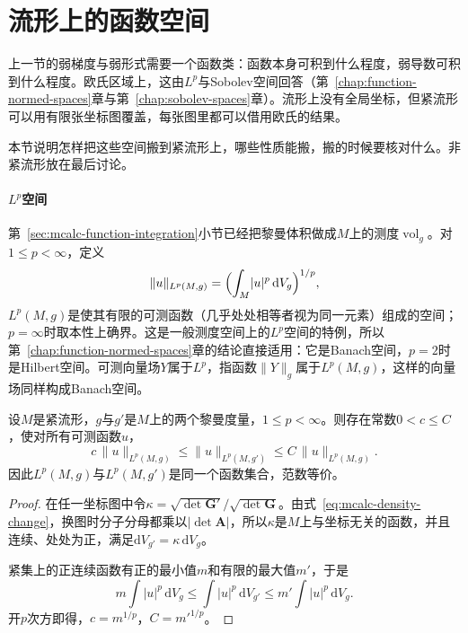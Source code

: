 \section{流形上的函数空间}
\label{sec:mcalc-function-spaces}

上一节的弱梯度与弱形式需要一个函数类：函数本身可积到什么程度，弱导数可积到什么程度。欧氏区域上，这由$L^p$与Sobolev空间回答（第~\ref{chap:function-normed-spaces}章与第~\ref{chap:sobolev-spaces}章）。流形上没有全局坐标，但紧流形可以用有限张坐标图覆盖，每张图里都可以借用欧氏的结果。

本节说明怎样把这些空间搬到紧流形上，哪些性质能搬，搬的时候要核对什么。非紧流形放在最后讨论。

\paragraph{$L^p$空间}
第~\ref{sec:mcalc-function-integration}小节已经把黎曼体积做成$M$上的测度$\operatorname{vol}_g$。对$1\leq p<\infty$，定义
\begin{equation}
\lVert u\rVert_{L^p(M,g)}=\Bigl(\int_M\lvert u\rvert^p\,\mathrm dV_g\Bigr)^{1/p},
\label{eq:mcalc-lp-norm}
\end{equation}
$L^p(M,g)$是使其有限的可测函数（几乎处处相等者视为同一元素）组成的空间；$p=\infty$时取本性上确界。这是一般测度空间上的$L^p$空间的特例，所以第~\ref{chap:function-normed-spaces}章的结论直接适用：它是Banach空间，$p=2$时是Hilbert空间。可测向量场$Y$属于$L^p$，指函数$\lVert Y\rVert_g$属于$L^p(M,g)$，这样的向量场同样构成Banach空间。

\begin{theorem}
\label{thm:mcalc-lp-metric-independence}
设$M$是紧流形，$g$与$g'$是$M$上的两个黎曼度量，$1\leq p<\infty$。则存在常数$0<c\leq C$，使对所有可测函数$u$，
\begin{equation}
c\,\lVert u\rVert_{L^p(M,g)}\leq\lVert u\rVert_{L^p(M,g')}\leq C\,\lVert u\rVert_{L^p(M,g)}.
\label{eq:mcalc-lp-equivalence}
\end{equation}
因此$L^p(M,g)$与$L^p(M,g')$是同一个函数集合，范数等价。
\end{theorem}

\begin{proof}
在任一坐标图中令$\kappa=\sqrt{\det\bm G'}/\sqrt{\det\bm G}$。由式~\eqref{eq:mcalc-density-change}，换图时分子分母都乘以$\lvert\det\bm A\rvert$，所以$\kappa$是$M$上与坐标无关的函数，并且连续、处处为正，满足$\mathrm dV_{g'}=\kappa\,\mathrm dV_g$。

紧集上的正连续函数有正的最小值$m$和有限的最大值$m'$，于是
\[
m\int\lvert u\rvert^p\,\mathrm dV_g\leq\int\lvert u\rvert^p\,\mathrm dV_{g'}\leq m'\int\lvert u\rvert^p\,\mathrm dV_g .
\]
开$p$次方即得，$c=m^{1/p}$，$C=m'^{1/p}$。
\end{proof}

